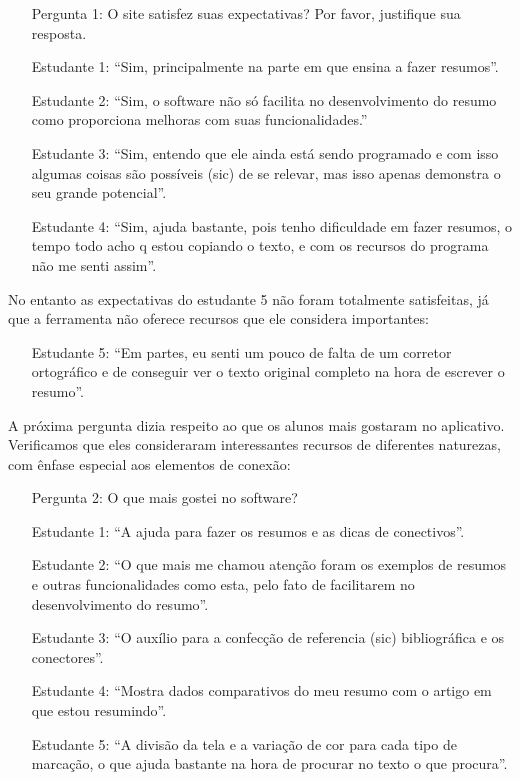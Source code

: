 \documentclass[portuguese]{textolivre}
\begin{document}
\begin{itemize}
    \item[Pergunta 1:] O site satisfez suas expectativas? Por favor, justifique sua resposta.
    \item[Estudante 1:] “Sim, principalmente na parte em que ensina a fazer resumos”.
    \item[Estudante 2:] “Sim, o software não só facilita no desenvolvimento do resumo como proporciona melhoras com suas funcionalidades.”
    \item[Estudante 3:] “Sim, entendo que ele ainda está sendo programado e com isso algumas coisas são possíveis (sic) de se relevar, mas isso apenas demonstra o seu grande potencial”.
    \item[Estudante 4:] “Sim, ajuda bastante, pois tenho dificuldade em fazer resumos, o tempo todo acho q estou copiando o texto, e com os recursos do programa não me senti assim”.
\end{itemize}

No entanto as expectativas do estudante 5 não foram totalmente satisfeitas, já que a ferramenta não oferece recursos que ele considera importantes:

\begin{itemize}
    \item[Estudante 5:] “Em partes, eu senti um pouco de falta de um corretor ortográfico e de conseguir ver o texto original completo na hora de escrever o resumo”.
\end{itemize}

A próxima pergunta dizia respeito ao que os alunos mais gostaram no aplicativo. Verificamos que eles consideraram interessantes recursos de diferentes naturezas, com ênfase especial aos elementos de conexão:

\begin{itemize}
    \item[Pergunta 2:] O que mais gostei no software? 
    \item[Estudante 1:] “A ajuda para fazer os resumos e as dicas de conectivos”.
    \item[Estudante 2:] “O que mais me chamou atenção foram os exemplos de resumos e outras funcionalidades como esta, pelo fato de facilitarem no desenvolvimento do resumo”.
    \item[Estudante 3:] “O auxílio para a confecção de referencia (sic) bibliográfica e os conectores”.
    \item[Estudante 4:] “Mostra dados comparativos do meu resumo com o artigo em que estou resumindo”.
    \item[Estudante 5:] “A divisão da tela e a variação de cor para cada tipo de marcação, o que ajuda bastante na hora de procurar no texto o que procura”.
\end{itemize}
\end{document}
